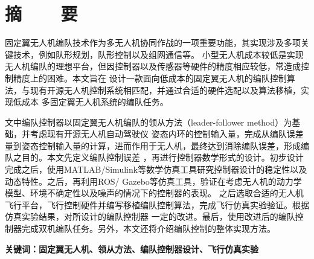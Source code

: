 \topskip=0pt

\vspace*{-7mm}

\begin{center}
  \heiti{}\textbf{\thesisTitle}
\end{center}

\vspace*{2mm}

{\let\clearpage\relax \chapter*{\textmd{摘~~~~要}}}
\setcounter{page}{1}

\vspace*{1mm}

\setlength{\parskip}{0em}

固定翼无人机编队技术作为多无人机协同作战的一项重要功能，其实现涉及多项关键技术，例如队形规划，队形控制以及组网通信等。
小型无人机成本较低是实现无人机编队的理想平台，但因控制器以及传感器等硬件的精度相应较低，常造成控制精度上的困难。本文旨在
设计一款面向低成本的固定翼无人机的编队控制算法，与现有开源无人机控制系统相匹配，并通过合适的硬件选配以及算法移植，实现低成本
多固定翼无人机系统的编队任务。

文中编队控制器以固定翼无人机编队的领从方法（leader-follower method）为基础，并考虑现有开源无人机自动驾驶仪
姿态内环的控制输入量，完成从编队误差量到姿态控制输入量的计算，进而作用于无人机，最终达到消除编队误差，形成编队之目的。本文先定义编队控制误差
，再进行控制器数学形式的设计。初步设计完成之后，使用MATLAB/Simulink等数学仿真工具研究控制器设计的稳定性以及动态特性。之后，再利用ROS/
Gazebo等仿真工具，验证在考虑无人机的动力学模型、环境不确定性以及噪声的情况下的控制器的表现。
之后选取合适的无人机飞行平台，飞行控制硬件并编写移植编队控制算法，完成飞行仿真实验验证。根据仿真实验结果，对所设计的编队控制器
一定的改进。最后，使用改进后的编队控制器完成双机编队任务。另外，本文还将介绍编队控制的整体实现方法。

\vspace{4ex}\noindent\textbf{\heiti 关键词：固定翼无人机、领从方法、编队控制器设计、飞行仿真实验}
\newpage

\topskip=0pt

\vspace*{2mm}

\begin{spacing}{0.95}
  \centering
  \heiti{}\textbf{\thesisTitleEN}
\end{spacing}

